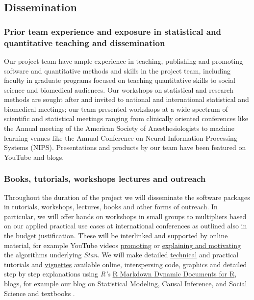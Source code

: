 \documentclass[11pt,notitlepage]{article}
\begin{document}
\subsection*{Dissemination}
\subsubsection*{Prior team experience and exposure in statistical and quantitative teaching and dissemination}
Our project team have ample experience in teaching, publishing and promoting software and quantitative methods and skills in the project 
team, including faculty in graduate programs focused on teaching quantitative skills to social science and biomedical audiences. 
Our workshops on statistical and research methods are sought after and invited to national and international statistical and biomedical 
meetings; our team presented workshops at a wide spectrum of scientific and statistical meetings ranging from clinically oriented 
conferences like the Annual meeting of the American Society of Anesthesiologists to machine learning venues like the Annual Conference 
on Neural Information Processing Systems (NIPS). Presentations  and products by our team have been featured on YouTube and blogs.   

\subsubsection*{Books, tutorials, workshops lectures and outreach}
Throughout the duration of the project we will disseminate the software packages in tutorials, workshops, lectures, books and other forms 
of outreach. In particular, we will offer hands on workshops in small groups to multipliers based on our applied practical use cases at 
international conferences as outlined also in the budget justification. These will be interlinked and supported by online material, for 
example YouTube videos \href{https://www.youtube.com/watch?v=pWow8Qe1snQ}{promoting} or 
\href{https://www.youtube.com/watch?v=pHsuIaPbNbY}{explaining and motivating} the algorithms underlying \textit{Stan}. We will make 
detailed \href{http://mc-stan.org/documentation/}{technical} and practical tutorials and 
\href{https://cran.r-project.org/web/packages/rstanarm/vignettes/aov.html}{vignettes} available online, interspersing code, graphics 
and detailed step by step explanations using \textit{R's}  \href{http://rmarkdown.rstudio.com/}{R Markdown \- Dynamic Documents for R}, 
blogs, for example our \href{http://andrewgelman.com/}{blog} on Statistical Modeling, Causal Inference, and Social Science and 
textbooks \cite{Gelman-Hill_2014}. 
\end{document}
